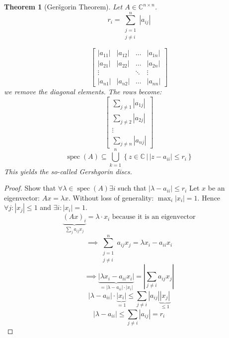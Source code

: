 \documentclass{article}
\newcounter{lecref}[section]
\numberwithin{lecref}{section}
\newtheorem{theorem}[lecref]{Theorem}
\newcommand{\setdef}[2]{\left\{\left.#1\,\right|\,#2\right\}}
\newcommand{\card}[1]{\left|#1\right|}
\begin{document}
\begin{theorem}[Ger\v{s}gorin Theorem] %
  Let $A \in \mathbb C^{n \times n}$.
  \[ r_i = \sum_{\substack{j=1 \\ j\neq i}}^n \card{a_{ij}} \]

  \[
    \begin{bmatrix}
      \card{a_{11}} & \card{a_{12}} & \dots  & \card{a_{1n}} \\
      \card{a_{21}} & \card{a_{22}} & \dots  & \card{a_{2n}} \\
      \vdots        &               & \ddots & \vdots \\
      \card{a_{n1}} & \card{a_{n2}} & \dots  & \card{a_{nn}}
    \end{bmatrix}
  \]
  we remove the diagonal elements. The rows become:
  \[
    \begin{bmatrix}
      \sum_{j\neq 1} \card{a_{1j}} \\
      \sum_{j\neq 2} \card{a_{2j}} \\
      \vdots \\
      \sum_{j\neq n} \card{a_{nj}}
    \end{bmatrix}
  \]
  \[ \operatorname{spec}(A) \subseteq \bigcup_{k=1}^n \setdef{z \in \mathbb C}{\card{z - a_{ii}} \leq r_{i}} \]
  This yields the so-called \emph{Gershgorin discs}.
\end{theorem}

\begin{proof}
  Show that $\forall \lambda \in \operatorname{spec}(A) \exists i$ such that $\card{\lambda - a_{ii}} \leq r_i$
  Let $x$ be an eigenvector: $Ax = \lambda x$.
  Without loss of generality: $\max_i \card{x_i} = 1$.
  Hence $\forall j: \card{x_j} \leq 1$ and $\exists i: \card{x_i} = 1$.
  \[ \underbrace{(Ax)_i}_{\sum_j a_{ij} x_j} = \lambda \cdot x_i \text{ because it is an eigenvector} \]
  \[ \implies \sum_{\substack{j = 1 \\ j \neq i}}^n a_{ij} x_j = \lambda x_i - a_{ii} x_i \]
  \[ \implies \underbrace{\card{\lambda x_i - a_{ii} x_i}}_{= \card{\lambda - a_{ii}} \cdot \card{x_i}} = \card{\sum_{j \neq i} a_{ij} x_j} \]
  \[ \card{\lambda - a_{ii}} \cdot \underbrace{\card{x_i}}_{=1} \leq \sum_{j \neq i} \card{a_{ij}} \underbrace{\card{x_j}}_{\leq 1} \]
  \[ \card{\lambda - a_{ii}} \leq \sum_{j \neq i} \card{a_{ij}} = r_i \]
\end{proof}
\end{document}
